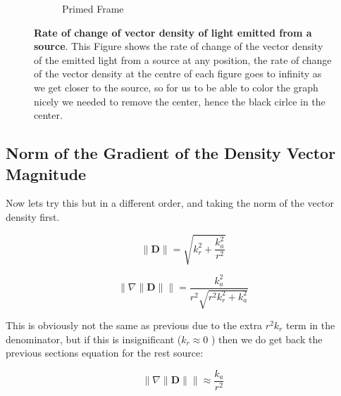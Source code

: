 \begin{figure}[H]
\begin{subfigure}{0.45\textwidth}
		\caption{Primed Frame}
		\label{subfig_2: light emitted from a source's rate of change of vector density}
	\end{subfigure}
	\caption{\textbf{Rate of change of vector density of light emitted from a source}. This Figure shows the rate of change of the vector density of the emitted light from a source at any position, the rate of change of the vector density at the centre of each figure goes to infinity as we get closer to the source, so for us to be able to color the graph nicely we needed to remove the center, hence the black cirlce in the center.}
	\label{fig: light emitted from a source's rate of change of vector density}
\end{figure}




\subsection{Norm of the Gradient of the Density Vector Magnitude}\label{subsect: Norm of the Gradient of the Density Vector Magnitude}

Now lets try this but in a different order, and taking the norm of the vector density first.

\begin{equation}
	\| \mathbf{D} \| = \sqrt{k_r^2 + \frac{k_{a}^2}{r^2} }
\end{equation}

\begin{equation}
	\Big\| \nabla \| \mathbf{D} \| \Big\| = \frac{k_{a}^2}{r^2\sqrt{r^2 k_r^2 + k_{a}^2}}
\end{equation}

This is obviously not the same as previous due to the extra $r^2 k_r$ term in the denominator, but if this is insignificant ($k_r\approx 0$ ) then we do get back the previous sections equation for the rest source:

\begin{equation}
	\Big\| \nabla \| \mathbf{D} \| \Big\| \approx  \frac{k_{a}}{r^2}
\end{equation}

